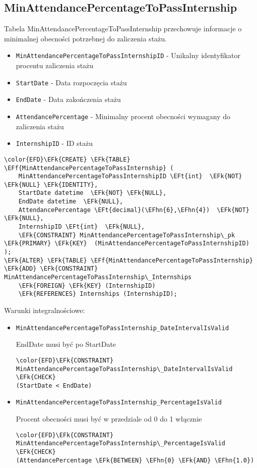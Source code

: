 \documentclass[11pt]{article}
\newcommand{\EFk}[1]{\textcolor{EFk}{\textbf{#1}}} %
\newcommand{\EFf}[1]{\textcolor{EFf}{#1}} %
\newcommand{\EFt}[1]{\textcolor{EFt}{\textbf{#1}}} %
\newcommand{\EFhn}[1]{\textcolor{EFhn}{#1}} %
\begin{document}
\subsection{MinAttendancePercentageToPassInternship}
\label{sec:org1ea943c}
Tabela MinAttendancePercentageToPassInternship przechowuje informacje o minimalnej obecności potrzebnej do zaliczenia stażu.
\begin{itemize}
\item \texttt{MinAttendancePercentageToPassInternshipID} - Unikalny identyfikator procentu zaliczenia stażu
\item \texttt{StartDate} - Data rozpoczęcia stażu
\item \texttt{EndDate} - Data zakończenia stażu
\item \texttt{AttendancePercentage} - Minimalny procent obecności wymagany do zaliczenia stażu
\item \texttt{InternshipID} - ID stażu
\end{itemize}
\begin{Code}
\begin{Verbatim}
\color{EFD}\EFk{CREATE} \EFk{TABLE} \EFf{MinAttendancePercentageToPassInternship} (
    MinAttendancePercentageToPassInternshipID \EFt{int}  \EFk{NOT} \EFk{NULL} \EFk{IDENTITY},
    StartDate datetime  \EFk{NOT} \EFk{NULL},
    EndDate datetime  \EFk{NULL},
    AttendancePercentage \EFt{decimal}(\EFhn{6},\EFhn{4})  \EFk{NOT} \EFk{NULL},
    InternshipID \EFt{int}  \EFk{NULL},
    \EFk{CONSTRAINT} MinAttendancePercentageToPassInternship\_pk \EFk{PRIMARY} \EFk{KEY}  (MinAttendancePercentageToPassInternshipID)
);
\EFk{ALTER} \EFk{TABLE} \EFf{MinAttendancePercentageToPassInternship} \EFk{ADD} \EFk{CONSTRAINT} MinAttendancePercentageToPassInternship\_Internships
    \EFk{FOREIGN} \EFk{KEY} (InternshipID)
    \EFk{REFERENCES} Internships (InternshipID);
\end{Verbatim}
\end{Code}
Warunki integralnościowe:


\begin{itemize}
\item \texttt{MinAttendancePercentageToPassInternship\_DateIntervalIsValid}

EndDate musi być po StartDate
\begin{Code}
\begin{Verbatim}
\color{EFD}\EFk{CONSTRAINT} MinAttendancePercentageToPassInternship\_DateIntervalIsValid \EFk{CHECK}
(StartDate < EndDate)
\end{Verbatim}
\end{Code}
\item \texttt{MinAttendancePercentageToPassInternship\_PercentageIsValid}

Procent obecności musi być w przedziale od 0 do 1 włącznie
\begin{Code}
\begin{Verbatim}
\color{EFD}\EFk{CONSTRAINT} MinAttendancePercentageToPassInternship\_PercentageIsValid \EFk{CHECK}
(AttendancePercentage \EFk{BETWEEN} \EFhn{0} \EFk{AND} \EFhn{1.0})
\end{Verbatim}
\end{Code}
\end{itemize}
\end{document}
